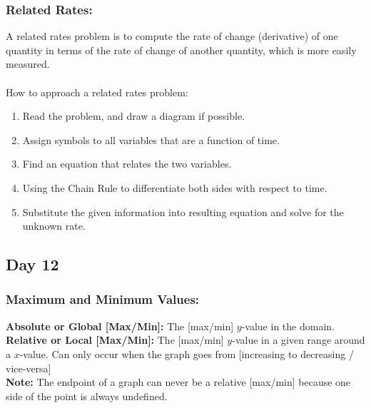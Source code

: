 \documentclass[12pt]{article}
\begin{document}
\subsubsection{Related Rates:}
A related rates problem is to compute the rate of change (derivative) of one quantity in terms of the rate of change of another quantity, which is more easily measured.
\\\\
\noindent How to approach a related rates problem:
\begin{enumerate}
    \item Read the problem, and draw a diagram if possible.
    \item Assign symbols to all variables that are a function of time.
    \item Find an equation that relates the two variables.
    \item Using the Chain Rule to differentiate both sides with respect to time.
    \item Substitute the given information into resulting equation and solve for the unknown
    rate.
\end{enumerate}

\subsection{Day 12}
\subsubsection{Maximum and Minimum Values:}
\textbf{Absolute or Global [Max/Min]: } The [max/min] $y$-value in the domain. \\
\textbf{Relative or Local [Max/Min]: } The [max/min] $y$-value in a given range around a $x$-value. Can only occur when the graph goes from [increasing to decreasing / vice-versa]\\
\textbf{Note: } The endpoint of a graph can never be a relative [max/min] because one side of the point is always undefined. 
\end{document}
